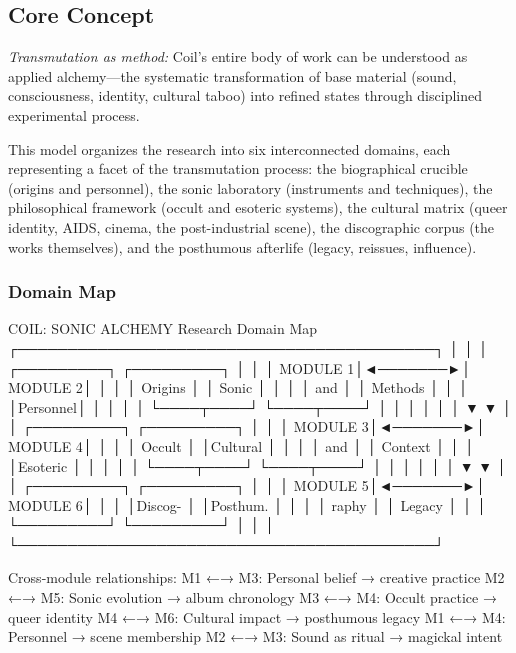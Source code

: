 \documentclass[11pt,letterpaper]{article}
\begin{document}
\subsection{Core Concept}

\begin{quotebox}
\textit{Transmutation as method:} Coil's entire body of work can be understood as applied alchemy---the systematic transformation of base material (sound, consciousness, identity, cultural taboo) into refined states through disciplined experimental process.
\end{quotebox}

This model organizes the research into six interconnected domains, each representing a facet of the transmutation process: the biographical crucible (origins and personnel), the sonic laboratory (instruments and techniques), the philosophical framework (occult and esoteric systems), the cultural matrix (queer identity, AIDS, cinema, the post-industrial scene), the discographic corpus (the works themselves), and the posthumous afterlife (legacy, reissues, influence).

\subsubsection{Domain Map}

\begin{asciibox}
                    COIL: SONIC ALCHEMY
                    Research Domain Map
    ┌──────────────────────────────────────────┐
    │                                          │
    │   ┌─────────┐         ┌─────────┐       │
    │   │ MODULE 1│◄───────►│ MODULE 2│       │
    │   │ Origins │         │  Sonic  │       │
    │   │   and   │         │ Methods │       │
    │   │Personnel│         │         │       │
    │   └────┬────┘         └────┬────┘       │
    │        │                   │             │
    │        ▼                   ▼             │
    │   ┌─────────┐         ┌─────────┐       │
    │   │ MODULE 3│◄───────►│ MODULE 4│       │
    │   │ Occult  │         │Cultural │       │
    │   │  and    │         │ Context │       │
    │   │Esoteric │         │         │       │
    │   └────┬────┘         └────┬────┘       │
    │        │                   │             │
    │        ▼                   ▼             │
    │   ┌─────────┐         ┌─────────┐       │
    │   │ MODULE 5│◄───────►│ MODULE 6│       │
    │   │Discog-  │         │Posthum. │       │
    │   │ raphy   │         │ Legacy  │       │
    │   └─────────┘         └─────────┘       │
    │                                          │
    └──────────────────────────────────────────┘

    Cross-module relationships:
    M1 ←→ M3: Personal belief → creative practice
    M2 ←→ M5: Sonic evolution  → album chronology
    M3 ←→ M4: Occult practice  → queer identity
    M4 ←→ M6: Cultural impact  → posthumous legacy
    M1 ←→ M4: Personnel        → scene membership
    M2 ←→ M3: Sound as ritual  → magickal intent
\end{asciibox}
\end{document}
